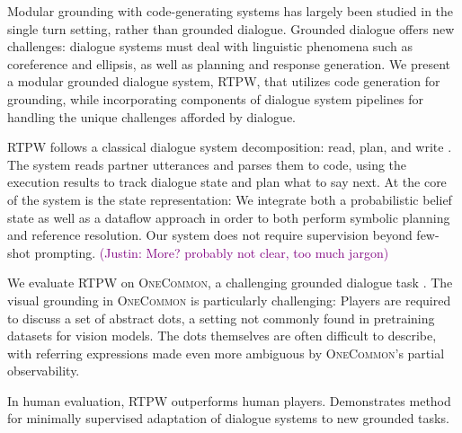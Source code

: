 \documentclass[11pt]{article}
\newcommand{\system}{RTPW}
\newcommand{\justin}[1]{{{\textcolor{purple}{(Justin: #1)}}}}
\begin{document}
Modular grounding with code-generating systems has largely been studied in the single turn setting,
rather than grounded dialogue.
Grounded dialogue offers new challenges:
dialogue systems must deal with linguistic phenomena such as coreference and ellipsis,
as well as planning and response generation.
We present a modular grounded dialogue system, \system{}, that utilizes code generation for 
grounding, while incorporating components of dialogue system pipelines for
handling the unique challenges afforded by dialogue.

\system{} follows a classical dialogue system decomposition:
read, plan, and write \citep{young2013pomdpsurvey}.
The system reads partner utterances and parses them to code,
using the execution results to track dialogue state and plan what to say next.
At the core of the system is the state representation:
We integrate both a probabilistic belief state \citep{young2006pomdp}
as well as a dataflow approach \citep{sm} in order to both perform symbolic planning
and reference resolution.
Our system does not require supervision beyond few-shot prompting.
\justin{More? probably not clear, too much jargon}

We evaluate \system{} on \textsc{OneCommon}, a challenging grounded dialogue task \citep{onecommon}.
The visual grounding in \textsc{OneCommon} is particularly challenging:
Players are required to discuss a set of abstract dots, a setting not commonly found in
pretraining datasets for vision models.
The dots themselves are often difficult to describe, with referring expressions
made even more ambiguous by \textsc{OneCommon}'s partial observability.

In human evaluation, \system{} outperforms human players.
Demonstrates method for minimally supervised adaptation of dialogue systems to new grounded tasks.
\end{document}
